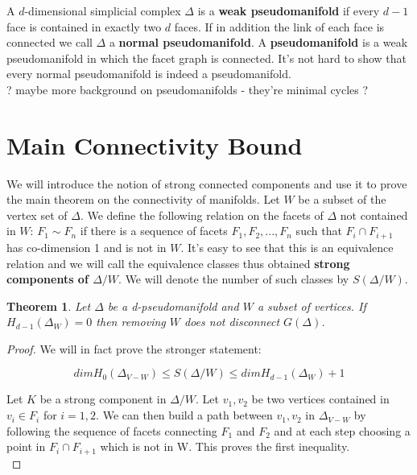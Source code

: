 \documentclass[a4paper]{article}
\newtheorem{theorem}{Theorem}[section]
\begin{document}
{A $d$-dimensional simplicial complex $\Delta$ is a \textbf{weak pseudomanifold} if every $d-1$ face is contained in exactly two $d$ faces. If in addition the link of each face is connected we call $\Delta$ a \textbf{normal pseudomanifold}. A \textbf{pseudomanifold} is a weak pseudomanifold in which the facet graph is connected. It's not hard to show that every normal pseudomanifold is indeed a pseudomanifold. \\

? maybe more background on pseudomanifolds - they're minimal cycles ?  


\section{Main Connectivity Bound}


	We will introduce the notion of strong connected components and use it to prove the main theorem on the connectivity of manifolds. Let $W$ be a subset of the vertex set of $\Delta$. We define the following relation on the facets of $\Delta$ not contained in $W$: $F_1 \sim  F_n$ if there is a sequence of facets $F_1, F_2,...,F_n$ such that $F_i \cap F_{i+1}$ has co-dimension 1 and is not in $W$. It's easy to see that this is an equivalence relation and we will call the equivalence classes thus obtained \textbf{strong components of $\Delta/W$}. We will denote the number of such classes by \textbf{$S(\Delta/W)$}. \\

\begin{theorem}Let $\Delta$ be a d-pseudomanifold and $W$ a subset of vertices. If $H_{d-1}(\Delta_W)=0$ then removing $W$ does not disconnect $G(\Delta)$. 
\end{theorem}

\begin{proof} We will in fact prove the stronger statement: 

\begin{equation}
dim H_0(\Delta_{V-W})\leq S(\Delta/W) \leq dim H_{d-1}(\Delta_W)+1
\end{equation}		

Let $K$ be a strong component in $\Delta/W$. Let $v_1,v_2$ be two vertices contained in  $v_i\in F_i$ for $i=1,2$. We can then build a path between $v_1,v_2$  in $\Delta_{V-W}$ by following the sequence of facets connecting $F_1$ and $F_2$ and at each step choosing a point in $F_i \cap F_{i+1}$ which is not in W. This proves the first inequality. \\


\end{proof}}
\end{document}
